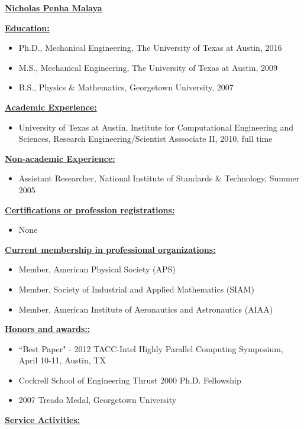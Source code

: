 \documentclass[12pt]{article}
\newcommand{\makeheading}[1]%
        {\hspace*{-\marginparsep minus \marginparwidth}%
         	\begin{center}
                {\underline{\bfseries #1}}\\%
                 \end{center}
         }
\newcommand{\makesection}[1]{\underline{\bfseries #1:}}
\begin{document}
\makeheading{Nicholas Penha Malaya}

\makesection{Education}
\begin{itemize}
\item Ph.D., Mechanical Engineering, The University of Texas at Austin, 2016
\item M.S., Mechanical Engineering, The University of Texas at Austin, 2009
\item B.S., Physics \& Mathematics, Georgetown University, 2007
\end{itemize}

\makesection{Academic Experience}
\begin{itemize}
\item University of Texas at Austin, Institute for Computational Engineering and Sciences,
Research Engineering/Scientist Asssociate II, 2010, full time
\end{itemize}

\makesection{Non-academic Experience}
\begin{itemize}
\item Assistant Researcher, National Institute of Standards \& Technology, Summer 2005
\end{itemize}

\makesection{Certifications or profession registrations}
\begin{itemize}
\item None
\end{itemize}

\makesection{Current membership in professional organizations}
\begin{itemize}
\item Member, American Physical Society (APS)
\item Member, Society of Industrial and Applied Mathematics (SIAM)
\item Member, American Institute of Aeronautics and Astronautics (AIAA)
\end{itemize}

\makesection{Honors and awards:}
\begin{itemize}
\item ``Best Paper" - 2012 TACC-Intel Highly Parallel Computing Symposium, April 10-11, Austin, TX
\item Cockrell School of Engineering Thrust 2000 Ph.D. Fellowship
\item 2007 Treado Medal, Georgetown University
\end{itemize}

\makesection{Service Activities}
\end{document}
